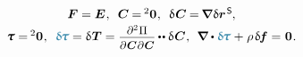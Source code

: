 \nopagebreak
\begin{equation}\label{variationfrominitialconfiguration}
\begin{array}{c}
\bm{F} = \UnitDyad \hspace{.1ex} ,
\:\;
\bm{C} \hspace{-0.1ex} = \hspace{-0.2ex} \zerobivalent
\hspace{.1ex} ,
\:\;
\variation{\hspace{.12ex}\bm{C}} \hspace{-0.1ex} = \hspace{-0.2ex} \boldnabla \hspace{.12ex} \variation{\currentlocationvector}^{\hspace{.2ex}\mathsf{S}}
\hspace{-0.1ex} ,
\\[.2em]
%
\cauchystress = \hspace{-0.2ex} \zerobivalent
\hspace{.1ex} ,
\:\;
\varbivalent{\hspace{-0.2ex}\cauchystress}
= \variation{\hspace{.1ex}\firstpiolakirchhoffstress}
= \scalebox{.9}{$
\displaystyle \frac{\raisemath{-0.125em}{ \partial^2 \hspace{.1ex} \potentialenergydensity }}{\raisemath{-0.1em}{\partial \hspace{.1ex} \bm{C} \hspace{.1ex} \partial \hspace{.1ex} \bm{C}}} $}
\hspace{-0.1ex} \dotdotp
\variation{\hspace{.12ex}\bm{C}}
\hspace{.1ex} ,
\:\:
\boldnabla \dotp \varbivalent{\hspace{-0.2ex}\cauchystress}
\hspace{.1ex} + \hspace{.1ex}
\rho \hspace{.25ex} \variation{\hspace{-0.2ex}\bm{f}}
= \hspace{.1ex}
\zerovector
\hspace{.11ex} .
\end{array}
\end{equation}

